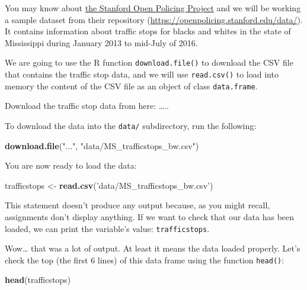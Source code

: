 \documentclass[]{book}
\newenvironment{Shaded}{\begin{snugshade}}{\end{snugshade}}
\newcommand{\KeywordTok}[1]{\textcolor[rgb]{0.13,0.29,0.53}{\textbf{{#1}}}}
\newcommand{\StringTok}[1]{\textcolor[rgb]{0.31,0.60,0.02}{{#1}}}
\newcommand{\NormalTok}[1]{{#1}}
\theoremstyle{definition}
\theoremstyle{definition}
\theoremstyle{remark}
\begin{document}
You may know about \href{https://openpolicing.stanford.edu}{the Stanford
Open Policing Project} and we will be working a sample dataset from
their repository (\url{https://openpolicing.stanford.edu/data/}). It
contains information about traffic stops for blacks and whites in the
state of Mississippi during January 2013 to mid-July of 2016.

We are going to use the R function \texttt{download.file()} to download
the CSV file that contains the traffic stop data, and we will use
\texttt{read.csv()} to load into memory the content of the CSV file as
an object of class \texttt{data.frame}.

Download the traffic stop data from here: \ldots{}..

To download the data into the \texttt{data/} subdirectory, run the
following:

\begin{Shaded}
\begin{Highlighting}[]
\KeywordTok{download.file}\NormalTok{(}\StringTok{"..."}\NormalTok{,}
              \StringTok{"data/MS_trafficstops_bw.csv"}\NormalTok{)}
\end{Highlighting}
\end{Shaded}

You are now ready to load the data:

\begin{Shaded}
\begin{Highlighting}[]
\NormalTok{trafficstops <-}\StringTok{ }\KeywordTok{read.csv}\NormalTok{(}\StringTok{'data/MS_trafficstops_bw.csv'}\NormalTok{)}
\end{Highlighting}
\end{Shaded}

This statement doesn't produce any output because, as you might recall,
assignments don't display anything. If we want to check that our data
has been loaded, we can print the variable's value:
\texttt{trafficstops}.

Wow\ldots{} that was a lot of output. At least it means the data loaded
properly. Let's check the top (the first 6 lines) of this data frame
using the function \texttt{head()}:

\begin{Shaded}
\begin{Highlighting}[]
\KeywordTok{head}\NormalTok{(trafficstops)}
\end{Highlighting}
\end{Shaded}
\end{document}
